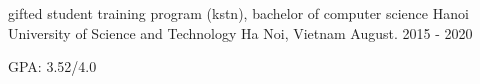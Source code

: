 


\begin{cventries}


\cventry
{gifted student training program (kstn), bachelor of computer science} %
{Hanoi University of Science and Technology} %
{Ha Noi, Vietnam} %
{August. 2015 - 2020} %
{ %
\begin{cvitems}
\item {GPA: 3.52/4.0}
\end{cvitems}
}


\end{cventries}
